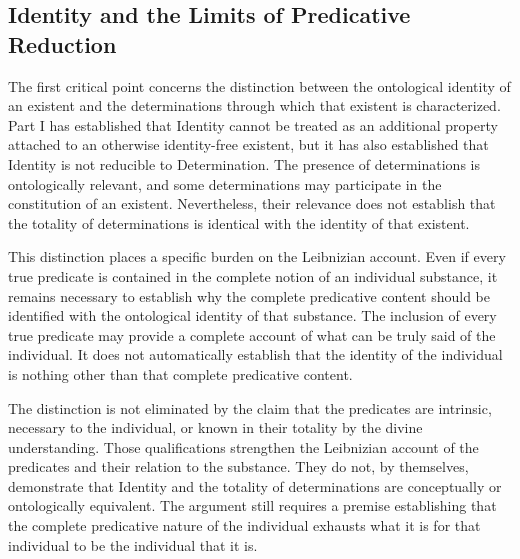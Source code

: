 
\subsection{Identity and the Limits of Predicative Reduction}
\label{subsec:ch08-leibniz-critical-examination}

\label{para:VS.B01.P01.C08.S07.SS08.P001}

The first critical point concerns the distinction
between the ontological identity of an existent
and the determinations through which that existent
is characterized. Part I has established that
Identity cannot be treated as an additional
property attached to an otherwise identity-free
existent, but it has also established that
Identity is not reducible to Determination.
The presence of determinations is ontologically
relevant, and some determinations may participate
in the constitution of an existent. Nevertheless,
their relevance does not establish that the
totality of determinations is identical with
the identity of that existent.


\label{para:VS.B01.P01.C08.S07.SS08.P002}

This distinction places a specific burden on
the Leibnizian account. Even if every true
predicate is contained in the complete notion
of an individual substance, it remains necessary
to establish why the complete predicative
content should be identified with the
ontological identity of that substance.
The inclusion of every true predicate may
provide a complete account of what can be
truly said of the individual. It does not
automatically establish that the identity
of the individual is nothing other than
that complete predicative content.

\label{para:VS.B01.P01.C08.S07.SS08.P003}

The distinction is not eliminated by the
claim that the predicates are intrinsic,
necessary to the individual, or known in
their totality by the divine understanding.
Those qualifications strengthen the
Leibnizian account of the predicates and
their relation to the substance. They do
not, by themselves, demonstrate that
Identity and the totality of determinations
are conceptually or ontologically equivalent.
The argument still requires a premise
establishing that the complete predicative
nature of the individual exhausts what
it is for that individual to be the
individual that it is.

